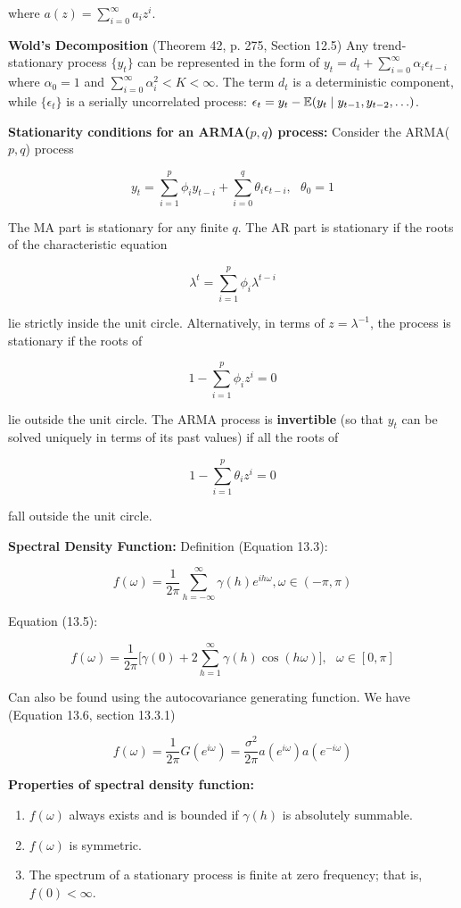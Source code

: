 where \(a(z) = \sum_{i=0}^\infty a_i z^i\). 

\textbf{Wold's Decomposition} (Theorem 42, p. 275, Section 12.5) Any trend-stationary process \(\{y_t\}\) can be represented in the form of \(y_t = d_t + \sum_{i=0}^\infty \alpha_i \epsilon_{t-i}\) where \(\alpha_0 = 1\) and \(\sum_{i=0}^\infty \alpha_i^2 < K < \infty\). The term \(d_t\) is a deterministic component, while \(\{\epsilon_t\}\) is a serially uncorrelated process: \(\epsilon_t = y_t - \mathbb{E}(y_t \mid y_{t-1}, y_{t-2}, \ldots) \).

\textbf{Stationarity conditions for an ARMA(\(p,q\)) process:} Consider the ARMA(\(p, q\)) process 

\[
y_t = \sum_{i=1}^p \phi_i y_{t-i} + \sum_{i=0}^q \theta_i \epsilon_{t-i}, \ \ \ \theta_0 = 1
\]

The MA part is stationary for any finite \(q\). The AR part is stationary if the roots of the characteristic equation

\[
\lambda^t = \sum_{i=1}^p \phi_i \lambda^{t-i}
\]

lie strictly inside the unit circle. Alternatively, in terms of \(z = \lambda^{-1}\), the process is stationary if the roots of 

\[
1 - \sum_{i=1}^p \phi_i z^i = 0
\]

lie outside the unit circle. The ARMA process is \textbf{invertible} (so that \(y_t\) can be solved uniquely in terms of its past values) if all the roots of 

\[
1 - \sum_{i=1}^p \theta_i z^i = 0
\]

fall outside the unit circle.

\textbf{Spectral Density Function:} Definition (Equation 13.3):

\[
f(\omega) = \frac{1}{2 \pi} \sum_{h = - \infty}^\infty \gamma(h) e^{i h \omega}, \omega \in (-\pi, \pi)
\]

Equation (13.5):

\[
f(\omega) = \frac{1}{2\pi} \bigg[ \gamma(0) + 2 \sum_{h=1}^\infty \gamma(h) \cos(h \omega) \bigg], \ \ \ \omega \in [0, \pi]
\]

Can also be found using the autocovariance generating function. We have (Equation 13.6, section 13.3.1)

\[
f(\omega) = \frac{1}{2\pi}G(e^{i \omega}) = \frac{\sigma^2}{2 \pi} a(e^{i \omega}) a(e^{- i \omega})
\]

\textbf{Properties of spectral density function:}

\begin{enumerate}[(1)]

\item \(f(\omega)\) always exists and is bounded if \(\gamma(h)\) is absolutely summable.

\item \(f(\omega)\) is symmetric.

\item The spectrum of a stationary process is finite at zero frequency; that is, \(f(0) < \infty\).

\end{enumerate}

